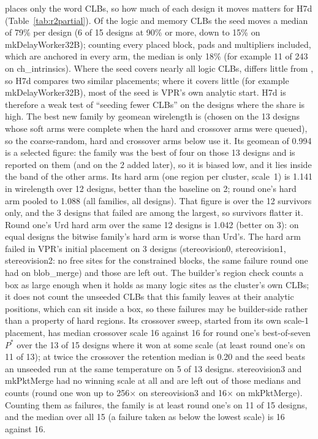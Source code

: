  places only the word CLBs, so how much of each design it moves matters for H7d
(Table~\ref{tab:r2partial}). Of the logic and memory CLBs the seed moves a median of 79\% per design
(6 of 15 designs at 90\% or more, down to 15\% on mkDelayWorker32B); counting every placed block, pads and
multipliers included, which are anchored in every arm, the median is only 18\% (for example
11 of 243 on ch\_intrinsics). Where the seed covers nearly all logic CLBs,
 differs little from , so H7d compares two similar placements; where it covers little (for example
mkDelayWorker32B), most of the seed is VPR's own analytic start. H7d is
therefore a weak test of ``seeding fewer CLBs'' on the designs where the share is high.
The best new family by geomean wirelength is  (chosen on the 13 designs whose
soft arms were complete when the hard and crossover arms were queued), so the coarse-random, hard and crossover arms below use it. Its geomean of
0.994 is a selected figure: the family was the best of four on those 13 designs and is reported on
them (and on the 2 added later), so it is biased low, and it lies inside the band of the other arms. Its hard arm (one region per cluster, scale~1) is 1.141 in wirelength over
12 designs, better than the baseline on 2; round one's hard arm pooled to 1.088 (all families, all designs). That figure is over the 12 survivors only, and the 3 designs that failed are among the largest, so
survivors flatter it. Round one's Urd hard arm over the same 12 designs is 1.042 (better on 3):
on equal designs the bitwise family's hard arm is worse than Urd's. The hard arm failed in VPR's initial placement on 3 designs
(stereovision0, stereovision1, stereovision2: no free sites for the constrained blocks, the same failure round one
had on blob\_merge) and those are left out. The builder's region check counts a box as large enough when it holds as many logic sites
as the cluster's own CLBs; it does not count the unseeded CLBs that this family leaves at their analytic positions,
which can sit inside a box, so these failures may be builder-side rather than a property of hard regions. Its crossover sweep, started from its own scale-1 placement, has median crossover scale
16 against 16 for round one's best-of-seven $P^*$ over the 13 of 15 designs where
it won at some scale (at least round one's on 11 of 13); at twice the crossover the retention median is
0.20 and the seed beats an unseeded run at the same temperature on 5 of 13 designs. stereovision3 and mkPktMerge had no winning scale at all and are left out of
those medians and counts (round one won up to 256$\times$ on stereovision3 and 16$\times$ on mkPktMerge). Counting them as failures, the family is at least round one's on
11 of 15 designs, and the median over all 15 (a failure taken as below the lowest scale) is
16 against 16.

